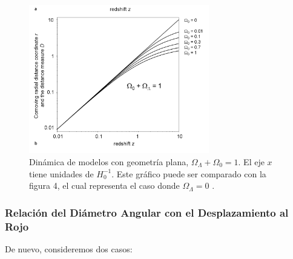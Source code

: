 \documentclass[11pt]{article}
\begin{document}
    
    \begin{figure}[H]         
     \centering
     \includegraphics[width=0.7\textwidth]{redshift_r76b.png}
        \caption{\footnotesize{Dinámica de modelos con geometría plana, $\Omega_{\Lambda} + \Omega_0 = 1$. El eje $x$ tiene unidades de  $H_0^{-1}$. Este gráfico puede ser comparado con la figura 4, el cual representa el caso donde $\Omega_{\Lambda}=0$ .}}
     \end{figure}
    
    \subsubsection{Relación del Diámetro Angular con el Desplazamiento al Rojo}
    
    De nuevo, consideremos dos casos: 
    
\end{document}
